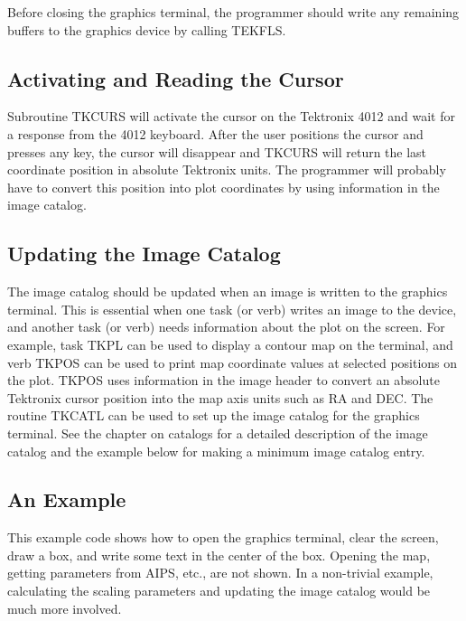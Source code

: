 Before closing the graphics terminal, the programmer should write any
remaining buffers to the graphics device by calling TEKFLS.

\subsection{Activating and Reading the Cursor}
Subroutine TKCURS will activate the cursor on the Tektronix 4012 and
wait for a response from the 4012 keyboard.  After the user positions
the cursor and presses any key, the cursor will disappear and TKCURS
will return the last coordinate position in absolute Tektronix units.
The programmer will probably have to convert this position into plot
coordinates by using information in the image catalog.


\subsection{Updating the Image Catalog}
The image catalog should be updated when an image is written to the
graphics terminal.  This is essential when one task (or verb) writes
an image to the device, and another task (or verb) needs information
about the plot on the screen. For example, task TKPL can be used to
display a contour map on the terminal, and verb TKPOS can be used to
print map coordinate values at selected positions on the plot. TKPOS
uses information in the image header to convert an absolute Tektronix
cursor position into the map axis units such as RA and DEC. The
routine TKCATL can be used to set up the image catalog for
the graphics terminal. See the chapter on catalogs for a detailed
description of the image catalog and the example below for making a
minimum image catalog entry.

\subsection{An Example}
This example code shows how to open the graphics terminal, clear the
screen, draw a box, and write some text in the center of the box.
Opening the map, getting parameters from AIPS, etc., are not shown.
In a non-trivial example, calculating the scaling parameters and
updating the image catalog would be much more involved.

